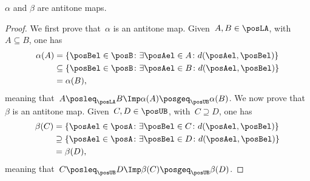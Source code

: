 \begin{lemma}
    \label{lem:alfabetaantitone}
    $\alpha$ and $\beta$ are antitone maps.
\end{lemma}
\begin{proof}
    We first prove that~$\alpha$ is an antitone map. Given~$A,B\in \posLA$, with~$A\subseteq B$, one has
    \begin{equation}
        \begin{aligned}
            \alpha(A)&=\{ \posBel\in \posB \colon \exists \posAel\in A\colon d(\posAel,\posBel)\}\\
            &\subseteq \{\posBel\in \posB \colon \exists \posAel\in B\colon d(\posAel,\posBel)\}\\
            &=\alpha(B),
        \end{aligned}
    \end{equation}
    meaning that~$A\posleq_{\posLA} B\Imp \alpha(A) \posgeq_{\posUB} \alpha(B)$.
    We now prove that~$\beta$ is an antitone map. Given~$C,D\in \posUB$, with~$C\supseteq D$, one has
    \begin{equation}
        \begin{aligned}
            \beta(C)&=\{\posAel\in \posA\colon \exists \posBel\in C\colon d(\posAel,\posBel)\}\\
            &\supseteq \{\posAel\in \posA\colon \exists \posBel\in D \colon d(\posAel,\posBel)\}\\
            &=\beta(D),
        \end{aligned}
    \end{equation}
    meaning that~$C\posleq_{\posUB} D \Imp \beta(C)\posgeq_{\posUB} \beta(D)$.
\end{proof}


